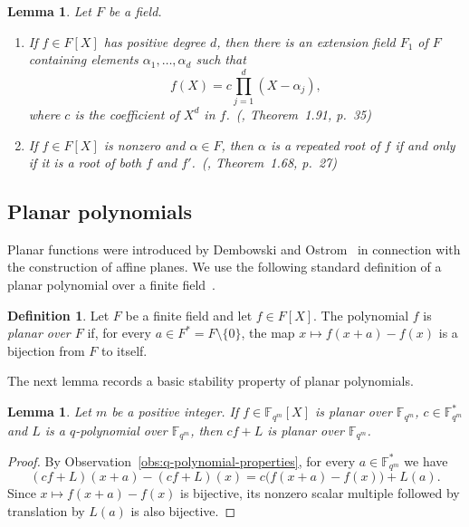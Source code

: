 \documentclass[12pt]{article}
\numberwithin{equation}{section}
\newtheorem{lemma}[theorem]{Lemma}
\theoremstyle{definition}
\newtheorem{definition}[theorem]{Definition}
\newcommand{\F}{\mathbb F}
\newcommand{\sourcecite}[2]{\cite{#1}, #2}
\begin{document}
\begin{lemma}\label{lem:polynomial-facts}
Let $F$ be a field.
\begin{enumerate}[label=\textup{(\arabic*)},ref=(\arabic*)]
\item\label{part:polynomial-factorization}
If $f\in F[X]$ has positive degree $d$, then there is an extension field $F_1$ of $F$ containing elements $\alpha_1,\ldots,\alpha_d$ such that
\[
        f(X)=c\prod_{j=1}^{d}(X-\alpha_j),
\]
where $c$ is the coefficient of $X^d$ in $f$.~\textup{(\sourcecite{LidlNiederreiter1997}{Theorem~1.91, p.~35})}
\item\label{part:repeated-root}
If $f\in F[X]$ is nonzero and $\alpha\in F$, then $\alpha$ is a repeated root of $f$ if and only if it is a root of both $f$ and $f'$.~\textup{(\sourcecite{LidlNiederreiter1997}{Theorem~1.68, p.~27})}
\end{enumerate}
\end{lemma}

\subsection{Planar polynomials}

Planar functions were introduced by Dembowski and Ostrom~\cite{DembowskiOstrom1968} in connection with the construction of affine planes. We use the following standard definition of a planar polynomial over a finite field~\cite{CMT2018}.

\begin{definition}\label{def:planar}
Let $F$ be a finite field and let $f\in F[X]$. The polynomial $f$ is \emph{planar over $F$} if, for every $a\in F^*=F\setminus\{0\}$, the map $x\mapsto f(x+a)-f(x)$ is a bijection from $F$ to itself.
\end{definition}

The next lemma records a basic stability property of planar polynomials.

\begin{lemma}\label{lem:q-polynomial-perturbation}
Let $m$ be a positive integer. If $f\in\F_{q^m}[X]$ is planar over $\F_{q^m}$, $c\in\F_{q^m}^*$ and $L$ is a $q$-polynomial over $\F_{q^m}$, then $cf+L$ is planar over $\F_{q^m}$.
\end{lemma}

\begin{proof}
By Observation~\ref{obs:q-polynomial-properties}, for every $a\in\F_{q^m}^*$ we have
\[
 (cf+L)(x+a)-(cf+L)(x)
 =c\bigl(f(x+a)-f(x)\bigr)+L(a).
\]
Since $x\mapsto f(x+a)-f(x)$ is bijective, its nonzero scalar multiple followed by translation by $L(a)$ is also bijective.
\end{proof}
\end{document}
